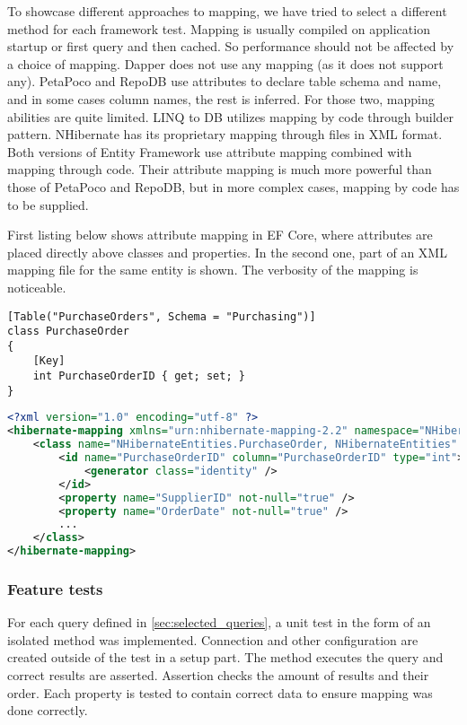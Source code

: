 To showcase different approaches to mapping, we have tried to select a different method for each framework test. Mapping is usually compiled on application startup or first query and then cached. So performance should not be affected by a choice of mapping. Dapper does not use any mapping (as it does not support any). PetaPoco and RepoDB use attributes to declare table schema and name, and in some cases column names, the rest is inferred. For those two, mapping abilities are quite limited. LINQ to DB utilizes mapping by code through builder pattern. NHibernate has its proprietary mapping through files in XML format. Both versions of Entity Framework use attribute mapping combined with mapping through code. Their attribute mapping is much more powerful than those of PetaPoco and RepoDB, but in more complex cases, mapping by code has to be supplied.

First listing below shows attribute mapping in EF Core, where attributes are placed directly above classes and properties. In the second one, part of an XML mapping file for the same entity is shown. The verbosity of the mapping is noticeable.

\begin{lstlisting}[language=CSharp,basicstyle=\ttfamily\footnotesize]
[Table("PurchaseOrders", Schema = "Purchasing")]
class PurchaseOrder
{
    [Key]
    int PurchaseOrderID { get; set; }
}
\end{lstlisting}

\begin{lstlisting}[language=xml,basicstyle=\ttfamily\footnotesize]
<?xml version="1.0" encoding="utf-8" ?>
<hibernate-mapping xmlns="urn:nhibernate-mapping-2.2" namespace="NHibernateEntities">
    <class name="NHibernateEntities.PurchaseOrder, NHibernateEntities" table="PurchaseOrders" schema="Purchasing">
        <id name="PurchaseOrderID" column="PurchaseOrderID" type="int">
            <generator class="identity" />
        </id>
        <property name="SupplierID" not-null="true" />
        <property name="OrderDate" not-null="true" />
        ...
    </class>
</hibernate-mapping>
\end{lstlisting}

\subsubsection{Feature tests}

For each query defined in \autoref{sec:selected_queries}, a unit test in the form of an isolated method was implemented. Connection and other configuration are created outside of the test in a setup part. The method executes the query and correct results are asserted. Assertion checks the amount of results and their order. Each property is tested to contain correct data to ensure mapping was done correctly.


